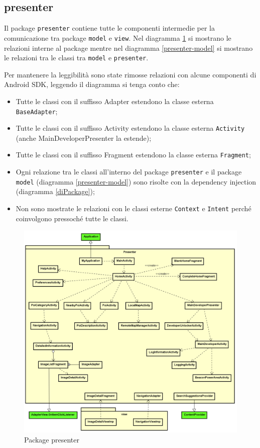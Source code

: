 \documentclass[../DefinizioneDiProdotto.tex,lanscape]{subfiles}
\begin{document}
\newpage
	\subsection{presenter}
		Il package \verb|presenter| contiene tutte le componenti intermedie per la comunicazione tra package \verb|model| e \verb|view|. Nel diagramma \ref{presenterPackage} si mostrano le relazioni interne al package mentre nel diagramma \ref{presenter-model} si mostrano le relazioni tra le classi tra \verb|model| e \verb|presenter|.
		
		Per mantenere la leggibilità sono state rimosse relazioni con alcune componenti di Android SDK, leggendo il diagramma si tenga conto che:
		\begin{itemize}
			\item Tutte le classi con il suffisso Adapter estendono la classe esterna \verb|BaseAdapter|;
			\item Tutte le classi con il suffisso Activity estendono la classe esterna \verb|Activity| (anche MainDeveloperPresenter la estende);
			\item Tutte le classi con il suffisso Fragment estendono la classe esterna \verb|Fragment|;
			\item Ogni relazione tra le classi all'interno del package \verb|presenter| e il package \verb|model| (diagramma \ref{presenter-model}) sono risolte con la dependency injection (diagramma \ref{diPackage});
			\item Non sono mostrate le relazioni con le classi esterne \verb|Context| e \verb|Intent| perché coinvolgono pressoché tutte le classi.
		\end{itemize}
	
\begin{figure}[p]
	\centering
	\includegraphics[height=0.9\textheight, width=\textwidth, keepaspectratio]{img/RelationPackage/presenter}
	\caption{Package presenter}
	\label{presenterPackage}
\end{figure}
\end{document}
